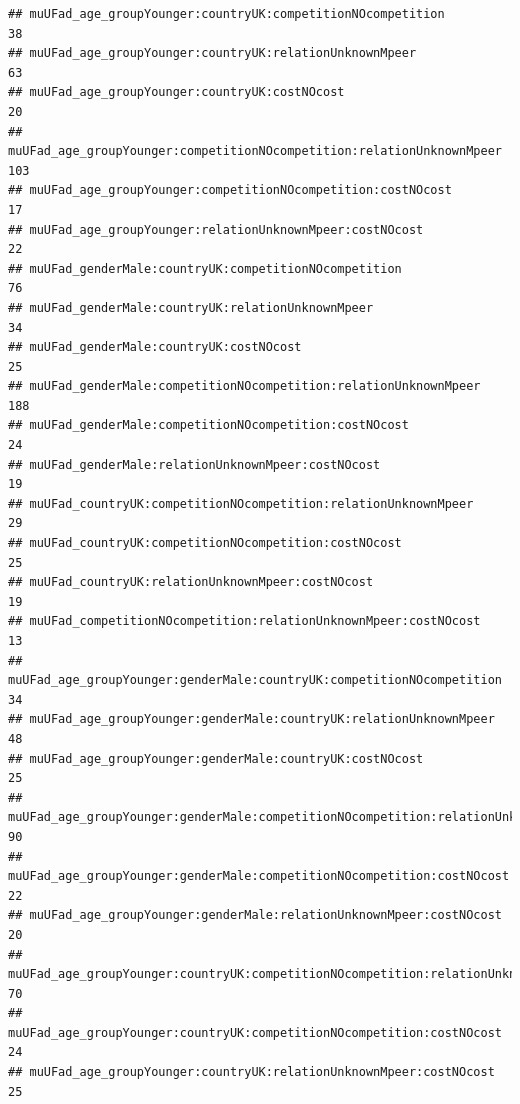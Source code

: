 \documentclass[
]{article}
\begin{document}
\begin{verbatim}
## muUFad_age_groupYounger:countryUK:competitionNOcompetition                                         38
## muUFad_age_groupYounger:countryUK:relationUnknownMpeer                                             63
## muUFad_age_groupYounger:countryUK:costNOcost                                                       20
## muUFad_age_groupYounger:competitionNOcompetition:relationUnknownMpeer                             103
## muUFad_age_groupYounger:competitionNOcompetition:costNOcost                                        17
## muUFad_age_groupYounger:relationUnknownMpeer:costNOcost                                            22
## muUFad_genderMale:countryUK:competitionNOcompetition                                               76
## muUFad_genderMale:countryUK:relationUnknownMpeer                                                   34
## muUFad_genderMale:countryUK:costNOcost                                                             25
## muUFad_genderMale:competitionNOcompetition:relationUnknownMpeer                                   188
## muUFad_genderMale:competitionNOcompetition:costNOcost                                              24
## muUFad_genderMale:relationUnknownMpeer:costNOcost                                                  19
## muUFad_countryUK:competitionNOcompetition:relationUnknownMpeer                                     29
## muUFad_countryUK:competitionNOcompetition:costNOcost                                               25
## muUFad_countryUK:relationUnknownMpeer:costNOcost                                                   19
## muUFad_competitionNOcompetition:relationUnknownMpeer:costNOcost                                    13
## muUFad_age_groupYounger:genderMale:countryUK:competitionNOcompetition                              34
## muUFad_age_groupYounger:genderMale:countryUK:relationUnknownMpeer                                  48
## muUFad_age_groupYounger:genderMale:countryUK:costNOcost                                            25
## muUFad_age_groupYounger:genderMale:competitionNOcompetition:relationUnknownMpeer                   90
## muUFad_age_groupYounger:genderMale:competitionNOcompetition:costNOcost                             22
## muUFad_age_groupYounger:genderMale:relationUnknownMpeer:costNOcost                                 20
## muUFad_age_groupYounger:countryUK:competitionNOcompetition:relationUnknownMpeer                    70
## muUFad_age_groupYounger:countryUK:competitionNOcompetition:costNOcost                              24
## muUFad_age_groupYounger:countryUK:relationUnknownMpeer:costNOcost                                  25

\end{verbatim}
\end{document}
